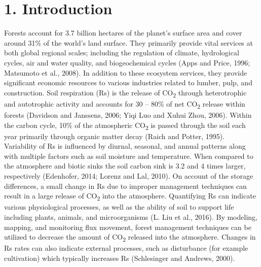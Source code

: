 \documentclass[]{elsarticle} %
\begin{document}
\newlength{\cslhangindent}
\setlength{\cslhangindent}{1.5em}
\newenvironment{cslreferences}%
  {\setlength{\parindent}{0pt}%
  \everypar{\setlength{\hangindent}{\cslhangindent}}\ignorespaces}%
  {\par}

\hypertarget{introduction}{%
\section{1. Introduction}\label{introduction}}

Forests account for 3.7 billion hectares of the planet's surface area
and cover around 31\% of the world's land surface. They primarily
provide vital services at both global regional scales; including the
regulation of climate, hydrological cycles, air and water quality, and
biogeochemical cycles (Apps and Price, 1996; Matsumoto et al., 2008). In
addition to these ecosystem services, they provide significant economic
resources to various industries related to lumber, pulp, and
construction. \newline \newline Soil respiration (Rs) is the release of
CO\textsubscript{2} through heterotrophic and autotrophic activity and
accounts for 30 -- 80\% of net CO\textsubscript{2} release within
forests (Davidson and Janssens, 2006; Yiqi Luo and Xuhui Zhou, 2006).
Within the carbon cycle, 10\% of the atmospheric CO\textsubscript{2} is
passed through the soil each year primarily through organic matter decay
(Raich and Potter, 1995). Variability of Rs is influenced by diurnal,
seasonal, and annual patterns along with multiple factors such as soil
moisture and temperature. When compared to the atmosphere and biotic
sinks the soil carbon sink is 3.2 and 4 times larger, respectively
(Edenhofer, 2014; Lorenz and Lal, 2010). On account of the storage
differences, a small change in Rs due to improper management techniques
can result in a large release of CO\textsubscript{2} into the
atmosphere. \newline \newline Quantifying Rs can indicate various
physiological processes, as well as the ability of soil to support life
including plants, animals, and microorganisms (L. Liu et al., 2016). By
modeling, mapping, and monitoring flux movement, forest management
techniques can be utilized to decrease the amount of CO\textsubscript{2}
released into the atmosphere. Changes in Rs rates can also indicate
external processes, such as disturbance (for example cultivation) which
typically increases Rs (Schlesinger and Andrews, 2000). \newline
\end{document}
